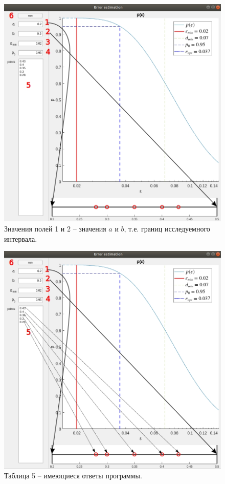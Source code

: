 \documentclass[a4paper,12pt]{article} %
\begin{document}
\begin{figure}[h!]
\begin{center}
\includegraphics[width=1\textwidth]{./pics/whole_window_interval}
\end{center}
\caption{Значения полей 1 и 2 -- значения $a$ и $b$, т.е. границ исследуемного интервала.} \label{img:whole_interval}
\end{figure}

\newpage

\begin{figure}[h!]
\begin{center}
\includegraphics[width=1\textwidth]{./pics/whole_window_interval2}
\end{center}
\caption{Таблица 5 -- имеющиеся ответы программы.} \label{img:whole_interval2}
\end{figure}
\end{document}
